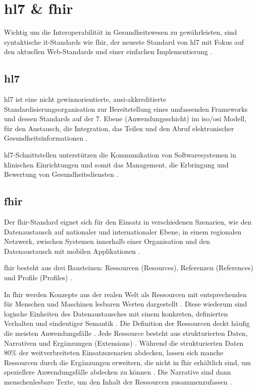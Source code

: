 \section{\acs{hl7} \& \acs{fhir}} \label{sec:hl7fhir}

Wichtig um die Interoperabilität in Gesundheitswesen zu gewährleisten, sind syntaktische \ac{it}-Standards wie \ac{fhir}, der neueste Standard von \ac{hl7} mit Fokus auf den aktuellen Web-Standards und einer einfachen Implementierung \cite{telemedizin, hl7, fhir}.

\subsection{\acs{hl7}} \label{subsec:hl7}

\acf{hl7} ist eine nicht gewinnorientierte, \ac{ansi}-akkreditierte Standardisierungsorganisation zur Bereitstellung eines umfassenden Frameworks und dessen Standards auf der 7. Ebene (Anwendungsschicht) im \ac{iso}/\ac{osi} Modell, für den Austausch, die Integration, das Teilen und den Abruf elektronischer Gesundheitsinformationen \cite{telemedizin, ehealtOk, hl7}. 

\ac{hl7}-Schnittstellen unterstützen die Kommunikation von Softwaresystemen in klinischen Einrichtungen und somit das Management, die Erbringung und Bewertung von Gesundheitsdiensten \cite{ehealtOk, hl7, fhir}.

\subsection{\acs{fhir}} \label{subsec:fhir}

Der \acf{fhir}-Standard eignet sich für den Einsatz in verschiedenen Szenarien, wie den Datenaustausch auf nationaler und internationaler Ebene, in einem regionalen Netzwerk, zwischen Systemen innerhalb einer Organisation und den Datenaustausch mit mobilen Applikationen \cite{ehealtOk, fhir}. 

\ac{fhir} besteht aus drei Bausteinen: Ressourcen (Resources), Referenzen (References) und Profile (Profiles) \cite{fhir}.

In \ac{fhir} werden Konzepte aus der realen Welt als Ressourcen mit entsprechenden für Menschen und Maschinen lesbaren Werten dargestellt \cite{ehealtOk}. Diese wiederum sind logische Einheiten des Datenaustausches mit einem konkreten, definierten Verhalten und eindeutiger Semantik \cite{fhir}. Die Definition der Ressourcen deckt häufig die meisten Anwendungsfälle \cite{ehealtOk}. Jede Ressource besteht aus strukturierten Daten, Narrativen und Ergänzungen (Extensions) \cite{fhir}. Während die strukturierten Daten 80\% der weitverbreiteten Einsatzszenarien abdecken, lassen sich manche Ressourcen durch die Ergänzungen erweitern, die nicht in \ac{fhir} erhältlich sind, um speziellere Anwendungsfälle abdecken zu können \cite{fhir, ehealtOk}. Die Narrative sind dann menschenlesbare Texte, um den Inhalt der Ressourcen zusammenzufassen \cite{fhir}.

